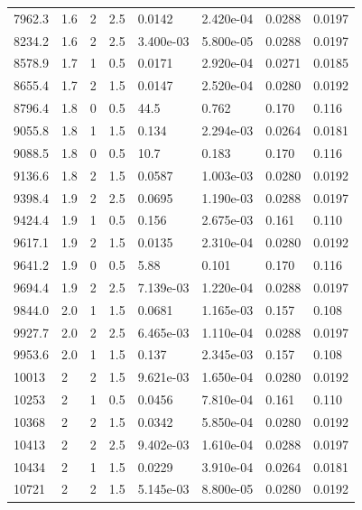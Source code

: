 \documentclass[preview]{standalone}
\begin{document}
{{{\begin{tabular}{L{1.2cm}C{1.2cm} C{0.3cm}C{0.5cm} C{1.4cm}C{1.4cm} C{1.4cm}C{1.4cm}}
  7962.3  &   1.6  & 2     & 2.5 &  0.0142  & 2.420e-04  & 0.0288 &  0.0197   \\ 
  8234.2  &   1.6  & 2     & 2.5 &  3.400e-03  & 5.800e-05  & 0.0288 &  0.0197   \\ 
  8578.9  &   1.7  & 1     & 0.5 &  0.0171  & 2.920e-04  & 0.0271 &  0.0185   \\ 
  8655.4  &   1.7  & 2     & 1.5 &  0.0147  & 2.520e-04  & 0.0280 &  0.0192   \\ 
  8796.4  &   1.8  & 0     & 0.5 &  44.5  & 0.762  & 0.170 &  0.116   \\ 
  9055.8  &   1.8  & 1     & 1.5 &  0.134  & 2.294e-03  & 0.0264 &  0.0181   \\ 
  9088.5  &   1.8  & 0     & 0.5 &  10.7  & 0.183  & 0.170 &  0.116   \\ 
  9136.6  &   1.8  & 2     & 1.5 &  0.0587  & 1.003e-03  & 0.0280 &  0.0192   \\ 
  9398.4  &   1.9  & 2     & 2.5 &  0.0695  & 1.190e-03  & 0.0288 &  0.0197   \\ 
  9424.4  &   1.9  & 1     & 0.5 &  0.156  & 2.675e-03  & 0.161 &  0.110   \\ 
  9617.1  &   1.9  & 2     & 1.5 &  0.0135  & 2.310e-04  & 0.0280 &  0.0192   \\ 
  9641.2  &   1.9  & 0     & 0.5 &  5.88  & 0.101  & 0.170 &  0.116   \\ 
  9694.4  &   1.9  & 2     & 2.5 &  7.139e-03  & 1.220e-04  & 0.0288 &  0.0197   \\ 
  9844.0  &   2.0  & 1     & 1.5 &  0.0681  & 1.165e-03  & 0.157 &  0.108   \\ 
  9927.7  &   2.0  & 2     & 2.5 &  6.465e-03  & 1.110e-04  & 0.0288 &  0.0197   \\ 
  9953.6  &   2.0  & 1     & 1.5 &  0.137  & 2.345e-03  & 0.157 &  0.108   \\ 
  10013  &     2  & 2     & 1.5 &  9.621e-03  & 1.650e-04  & 0.0280 &  0.0192   \\ 
  10253  &     2  & 1     & 0.5 &  0.0456  & 7.810e-04  & 0.161 &  0.110   \\ 
  10368  &     2  & 2     & 1.5 &  0.0342  & 5.850e-04  & 0.0280 &  0.0192   \\ 
  10413  &     2  & 2     & 2.5 &  9.402e-03  & 1.610e-04  & 0.0288 &  0.0197   \\ 
  10434  &     2  & 1     & 1.5 &  0.0229  & 3.910e-04  & 0.0264 &  0.0181   \\ 
  10721  &     2  & 2     & 1.5 &  5.145e-03  & 8.800e-05  & 0.0280 &  0.0192   \\ 

\end{tabular}}}}
\end{document}
